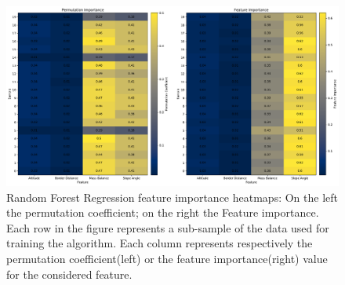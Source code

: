 \begin{figure}[!tp]
	\centering		  
	\includegraphics[width=1.\textwidth]{figures/RFR_heatmap.pdf}
	\caption{Random Forest Regression feature importance heatmaps: On the left the permutation coefficient; on the right the Feature importance. Each row in the figure represents a sub-sample of the data used for training the algorithm. Each column represents respectively the permutation coefficient(left) or the feature importance(right) value for the considered feature.}
	\label{fig:rfr-heatmap}
\end{figure}

